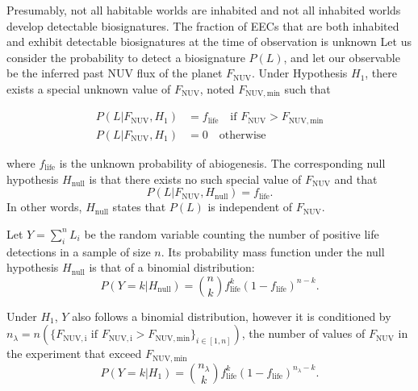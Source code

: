\documentclass[twocolumn,twocolappendix,linenumbers]{aastex631}
\begin{document}
Presumably, not all habitable worlds are inhabited and not all inhabited worlds develop detectable biosignatures.
The fraction of \glspl{EEC} that are both inhabited and exhibit detectable biosignatures at the time of observation is unknown 
Let us consider the probability to detect a biosignature $P(L)$, and let our observable be the inferred past \gls{NUV} flux of the planet $F_\mathrm{NUV}$.
Under Hypothesis $H_1$, there exists a special unknown value of $F_\mathrm{NUV}$, noted $F_\mathrm{NUV, min}$ such that

\begin{align}
    P(L|F_\mathrm{NUV},H_1) &=  f_\mathrm{life} \quad \text{if } F_\mathrm{NUV}>F_\mathrm{NUV, min}\\
    P(L|F_\mathrm{NUV},H_1) &=  0               \quad  \text{otherwise}
\end{align}

where $f_\mathrm{life}$ is the unknown probability of abiogenesis.
The corresponding null hypothesis $H_\mathrm{null}$ is that there exists no such special value of $F_\mathrm{NUV}$ and that
\begin{equation}
P(L|F_\mathrm{NUV},H_\mathrm{null}) = f_\mathrm{life}.
\end{equation}
In other words, $H_\mathrm{null}$ states that $P(L)$ is independent of $F_\mathrm{NUV}$.

Let $Y=\sum_i^n L_i$ be the random variable counting the number of positive life detections in a sample of size $n$. Its probability mass function under the null hypothesis $H_\mathrm{null}$ is that of a binomial distribution:
\begin{equation}
    \label{eq:semian:likelihoodHnull}
P(Y=k|H_\mathrm{null}) = \binom{n}{k}f_\mathrm{life}^k(1-f_\mathrm{life})^{n-k}.
\end{equation}

Under $H_1$, $Y$ also follows a binomial distribution, however it is conditioned by $n_{\lambda} = n(\{F_\mathrm{NUV, i} \text{ if } F_\mathrm{NUV, i}>F_\mathrm{NUV, min}\}_{i \in [1,n]})$, the number of values of $F_\mathrm{NUV}$ in the experiment that exceed $F_\mathrm{NUV, min}$
\begin{equation}
\label{eq:semian:likelihoodH1}
P(Y=k|H_1) = \binom{n_{\lambda}}{k}f_\mathrm{life}^k(1-f_\mathrm{life})^{n_{\lambda}-k}.
\end{equation}
\end{document}
